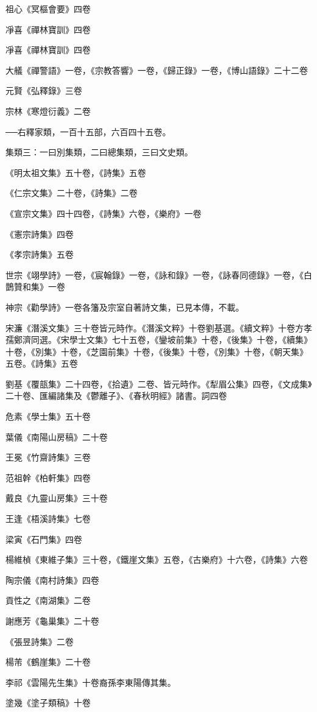 祖心《冥樞會要》四卷

凈喜《禪林寶訓》四卷

凈喜《禪林寶訓》四卷

大艤《禪警語》一卷，《宗教答響》一卷，《歸正錄》一卷，《博山語錄》二十二卷

元賢《弘釋錄》三卷

宗林《寒燈衍義》二卷

──右釋家類，一百十五部，六百四十五卷。

集類三：一曰別集類，二曰總集類，三曰文史類。

《明太祖文集》五十卷，《詩集》五卷

《仁宗文集》二十卷，《詩集》二卷

《宣宗文集》四十四卷，《詩集》六卷，《樂府》一卷

《憲宗詩集》四卷

《孝宗詩集》五卷

世宗《翊學詩》一卷，《宸翰錄》一卷，《詠和錄》一卷，《詠春同德錄》一卷，《白鵲贊和集》一卷

神宗《勸學詩》一卷各籓及宗室自著詩文集，已見本傳，不載。

宋濂《潛溪文集》三十卷皆元時作。《潛溪文粹》十卷劉基選。《續文粹》十卷方孝孺鄭濟同選。《宋學士文集》七十五卷，《鑾坡前集》十卷，《後集》十卷，《續集》十卷，《別集》十卷，《芝園前集》十卷，《後集》十卷，《別集》十卷，《朝天集》五卷。《詩集》五卷

劉基《覆瓿集》二十四卷，《拾遺》二卷、皆元時作。《犁眉公集》四卷，《文成集》二十卷、匯編諸集及《鬱離子》、《春秋明經》諸書。詞四卷

危素《學士集》五十卷

葉儀《南陽山房稿》二十卷

王冕《竹齋詩集》三卷

范祖幹《柏軒集》四卷

戴良《九靈山房集》三十卷

王逢《梧溪詩集》七卷

梁寅《石門集》四卷

楊維楨《東維子集》三十卷，《鐵崖文集》五卷，《古樂府》十六卷，《詩集》六卷

陶宗儀《南村詩集》四卷

貢性之《南湖集》二卷

謝應芳《龜巢集》二十卷

《張昱詩集》二卷

楊芾《鶴崖集》二十卷

李祁《雲陽先生集》十卷裔孫李東陽傳其集。

塗幾《塗子類稿》十卷

